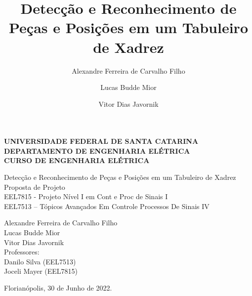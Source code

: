 \documentclass[a4paper,12pt,twoside]{article}
\title{Detecção e Reconhecimento de Peças e Posições em um Tabuleiro de Xadrez}
\author{Alexandre Ferreira de Carvalho Filho}
\author{Lucas Budde Mior}
\author{Vitor Dias Javornik}
\newenvironment{boldenv}
{\bfseries}
{}
\begin{document}
\begin{titlepage}
    \large
    \begin{center}
        \begin{boldenv}
            UNIVERSIDADE FEDERAL DE SANTA CATARINA \\
            DEPARTAMENTO DE ENGENHARIA ELÉTRICA \\
            CURSO DE ENGENHARIA ELÉTRICA \\
            \vspace*{2cm}

            \vspace*{\fill}
            Detecção e Reconhecimento de Peças e Posições em um Tabuleiro de Xadrez \\
            \vspace*{1cm}
            Proposta de Projeto \\
            \vspace*{1cm}
            EEL7815 - Projeto Nível I em Cont e Proc de Sinais I \\
            EEL7513 – Tópicos Avançados Em Controle Processos De Sinais IV
            \vspace*{\fill}

            Alexandre Ferreira de Carvalho Filho \\
            Lucas Budde Mior \\
            Vitor Dias Javornik \\
            \vspace{0.5cm}
            Professores: \\
            Danilo Silva (EEL7513) \\
            Joceli Mayer (EEL7815)

            \vfill

            Florianópolis, 30 de Junho de 2022.
        \end{boldenv}
    \end{center}
\end{titlepage}
\renewcommand{\contentsname}{Sumário}

\pagestyle{empty}
\tableofcontents
\newpage



\pagestyle{plain}
\end{document}
